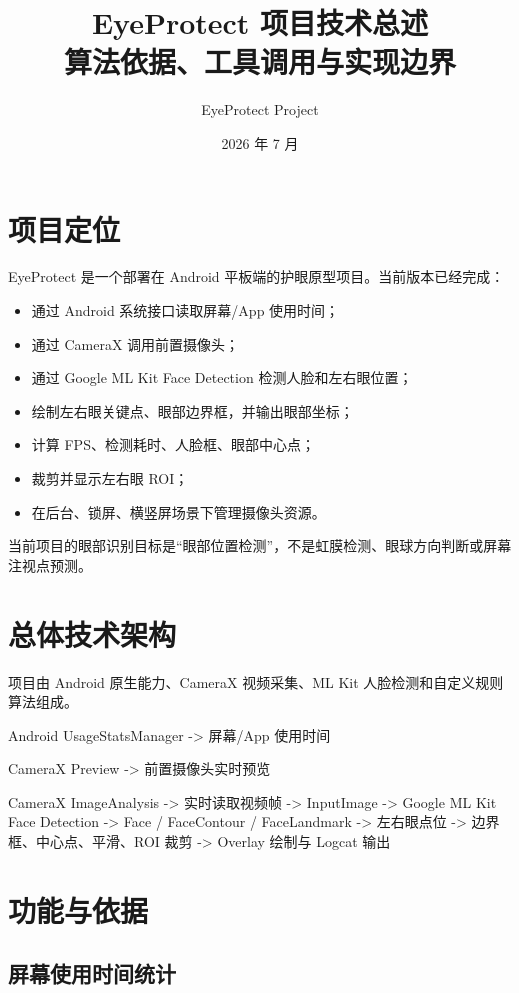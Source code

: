 \documentclass[UTF8,a4paper,11pt]{ctexart}
\title{\textbf{EyeProtect 项目技术总述}\\\large 算法依据、工具调用与实现边界}
\author{EyeProtect Project}
\date{2026 年 7 月}
\begin{document}
\maketitle
\tableofcontents
\newpage

\section{项目定位}

EyeProtect 是一个部署在 Android 平板端的护眼原型项目。当前版本已经完成：

\begin{itemize}
  \item 通过 Android 系统接口读取屏幕/App 使用时间；
  \item 通过 CameraX 调用前置摄像头；
  \item 通过 Google ML Kit Face Detection 检测人脸和左右眼位置；
  \item 绘制左右眼关键点、眼部边界框，并输出眼部坐标；
  \item 计算 FPS、检测耗时、人脸框、眼部中心点；
  \item 裁剪并显示左右眼 ROI；
  \item 在后台、锁屏、横竖屏场景下管理摄像头资源。
\end{itemize}

当前项目的眼部识别目标是“眼部位置检测”，不是虹膜检测、眼球方向判断或屏幕注视点预测。

\section{总体技术架构}

项目由 Android 原生能力、CameraX 视频采集、ML Kit 人脸检测和自定义规则算法组成。

\begin{code}
Android UsageStatsManager
  -> 屏幕/App 使用时间

CameraX Preview
  -> 前置摄像头实时预览

CameraX ImageAnalysis
  -> 实时读取视频帧
  -> InputImage
  -> Google ML Kit Face Detection
  -> Face / FaceContour / FaceLandmark
  -> 左右眼点位
  -> 边界框、中心点、平滑、ROI 裁剪
  -> Overlay 绘制与 Logcat 输出
\end{code}

\section{功能与依据}

\subsection{屏幕使用时间统计}
\end{document}
